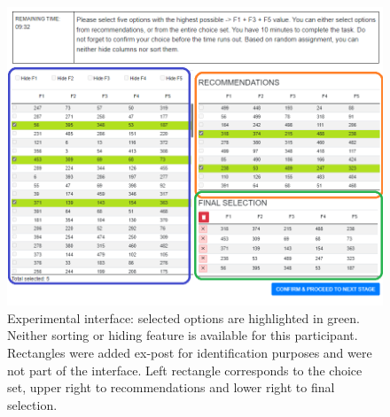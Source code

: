 \documentclass[a4paper,12pt]{article}
\begin{document}
\begin{figure}
\begin{center}    \includegraphics[width=0.99\linewidth]{staticFiles/EDITEDexperimentScreenFULL.png}
    \caption{Experimental interface: selected options are highlighted in green. Neither sorting or hiding feature is available for this participant. Rectangles were added ex-post for identification purposes and were not part of the interface. Left rectangle corresponds to the choice set, upper right to recommendations and lower right to final selection.}
    \label{fig:experimentInterface}
\end{center}
\end{figure}
\end{document}
